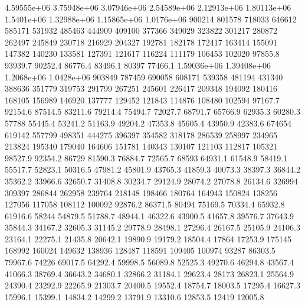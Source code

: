 4.59555e+06      3.75948e+06      3.07946e+06      2.54589e+06      2.12913e+06      1.80113e+06      1.5401e+06      1.32988e+06      1.15865e+06      1.0176e+06      900214      801578      718033      646612      585171      531932      485463      444909      409100      377366      349029      323822      301217      280872      262497      245849      230718      216929      204327      192781      182178      172417      163414      155091      147382      140230      133581      127391      121617      116224      111179      106453      102020      97855.8      93939.7      90252.4      86776.4      83496.1      80397      77466.1      
1.59036e+06      1.39408e+06      1.2068e+06      1.0428e+06      903849      787459      690058      608171      539358      481194      431340      388636      351779      319753      291799      267251      245601      226417      209348      194092      180416      168105      156989      146920      137777      129452      121843      114876      108480      102594      97167.7      92154.6      87514.5      83211.6      79214.4      75494.7      72027.7      68791.7      65766.9      62935.3      60280.3      57788      55445.4      53241.2      51163.9      49204.2      47353.8      45605.4      43950.9      42383.6      
674654      619142      557799      498351      444275      396397      354582      318178      286539      258997      234965      213824      195340      179040      164606      151781      140343      130107      121103      112817      105321      98527.9      92354.2      86729      81590.3      76884.7      72565.7      68593      64931.1      61548.9      58419.1      55517.7      52823.1      50316.5      47981.2      45801.9      43765.3      41859.3      40073.3      38397.3      36844.2      35362.2      33966.6      32650.7      31408.8      30234.7      29124.9      28074.2      27078.8      26134.6      
326994      309397      286844      262958      239764      218148      198466      180764      164943      150824      138256      127056      117058      108112      100092      92876.2      86371.5      80494      75169.5      70334.4      65932.8      61916.6      58244      54879.5      51788.7      48944.1      46322.6      43900.5      41657.8      39576.7      37643.9      35844.3      34167.2      32605.3      31145.2      29778.9      28498.1      27296.4      26167.5      25105.9      24106.3      23164.1      22275.1      21435.8      20642.1      19890.9      19179.2      18504.4      17864      17253.9      
175145      168992      160024      149632      138936      128487      118591      109405      100974      93287      86303.5      79967.6      74226      69017.5      64292.4      59998.5      56089.8      52525.3      49270.6      46294.8      43567.4      41066.3      38769.4      36643.2      34680.1      32866.2      31184.1      29623.4      28173      26823.1      25564.9      24390.4      23292.9      22265.9      21303.7      20400.5      19552.4      18754.7      18003.5      17295.4      16627.3      15996.1      15399.1      14834.2      14299.2      13791.9      13310.6      12853.5      12419      12005.8      
